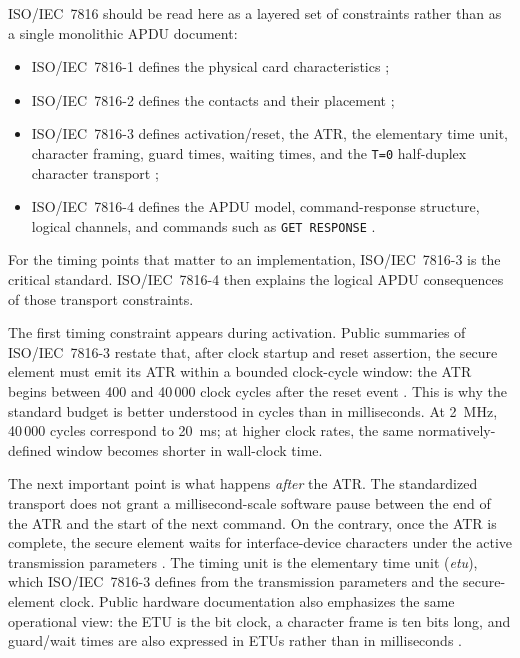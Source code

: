 ISO/IEC~7816 should be read here as a layered set of constraints rather
than as a single monolithic APDU document:

\begin{itemize}
\item ISO/IEC~7816-1 defines the physical card characteristics
  \cite{iso7816-1};
\item ISO/IEC~7816-2 defines the contacts and their placement
  \cite{iso7816-2};
\item ISO/IEC~7816-3 defines activation/reset, the ATR, the elementary
  time unit, character framing, guard times, waiting times, and the
  \texttt{T=0} half-duplex character transport \cite{iso7816-3};
\item ISO/IEC~7816-4 defines the APDU model, command-response
  structure, logical channels, and commands such as
  \texttt{GET RESPONSE} \cite{iso7816-4}.
\end{itemize}

For the timing points that matter to an implementation,
ISO/IEC~7816-3 is the critical standard. ISO/IEC~7816-4 then explains
the logical APDU consequences of those transport constraints.

The first timing constraint appears during activation. Public summaries
of ISO/IEC~7816-3 restate that, after clock startup and reset
assertion, the secure element must emit its ATR within a bounded clock-cycle
window: the ATR begins between 400 and 40\,000 clock cycles after the
reset event \cite{adi-smartcard-fundamentals}. This is why the standard
budget is better understood in cycles than in milliseconds. At
2~MHz, 40\,000 cycles correspond to 20~ms; at higher clock rates, the
same normatively-defined window becomes shorter in wall-clock time.

The next important point is what happens \emph{after} the ATR. The
standardized transport does not grant a millisecond-scale software pause
between the end of the ATR and the start of the next command. On the
contrary, once the ATR is complete, the secure element waits for interface-device
characters under the active transmission parameters
\cite{iso7816-3}. The timing unit is the elementary time unit
(\emph{etu}), which ISO/IEC~7816-3 defines from the transmission
parameters and the secure-element clock. Public hardware documentation also
emphasizes the same operational view: the ETU is the bit clock, a
character frame is ten bits long, and guard/wait times are also
expressed in ETUs rather than in milliseconds
\cite{microchip-iso7816-usart,microchip-guardtime}.

